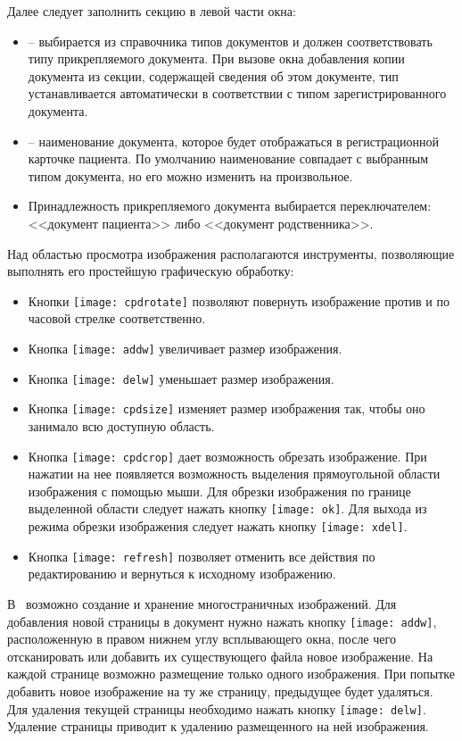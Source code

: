 {Далее следует заполнить секцию  в левой части окна:
\begin{itemize}
 \item {} -- выбирается из справочника типов документов и должен соответствовать типу прикрепляемого документа. При вызове окна добавления копии документа из секции, содержащей сведения об этом документе, тип устанавливается автоматически в соответствии с типом зарегистрированного документа. 
 \item {} -- наименование документа, которое будет отображаться в регистрационной карточке пациента. По умолчанию наименование совпадает с выбранным типом документа, но его можно изменить на произвольное.
 \item Принадлежность прикрепляемого документа выбирается переключателем: <<документ пациента>> либо <<документ родственника>>.
\end{itemize}

Над областью просмотра изображения располагаются инструменты, позволяющие выполнять его простейшую графическую обработку:
\begin{itemize}
 \item Кнопки \texttt{[image: cpdrotate]} позволяют повернуть изображение против и по часовой стрелке соответственно.
 \item Кнопка \texttt{[image: addw]} увеличивает размер изображения.
 \item Кнопка \texttt{[image: delw]} уменьшает размер изображения.
 \item Кнопка \texttt{[image: cpdsize]} изменяет размер изображения так, чтобы оно занимало всю доступную область.
 \item Кнопка \texttt{[image: cpdcrop]} дает возможность обрезать изображение. При нажатии на нее появляется возможность выделения прямоугольной области изображения с помощью мыши. Для обрезки изображения по границе выделенной области следует нажать кнопку \texttt{[image: ok]}. Для выхода из режима обрезки изображения следует нажать кнопку \texttt{[image: xdel]}.
 \item Кнопка \texttt{[image: refresh]} позволяет отменить все действия по редактированию и вернуться к исходному изображению.  
\end{itemize}

В \tmis~возможно создание и хранение многостраничных изображений. Для добавления новой страницы в документ нужно нажать кнопку 
\texttt{[image: addw]}, расположенную в правом нижнем углу всплывающего окна, после чего отсканировать или добавить их существующего файла новое изображение.  На каждой странице возможно размещение только одного изображения. При попытке добавить новое изображение на ту же страницу, предыдущее будет удаляться. Для удаления текущей страницы необходимо нажать кнопку \texttt{[image: delw]}. Удаление страницы приводит к удалению размещенного на ней изображения.

}

